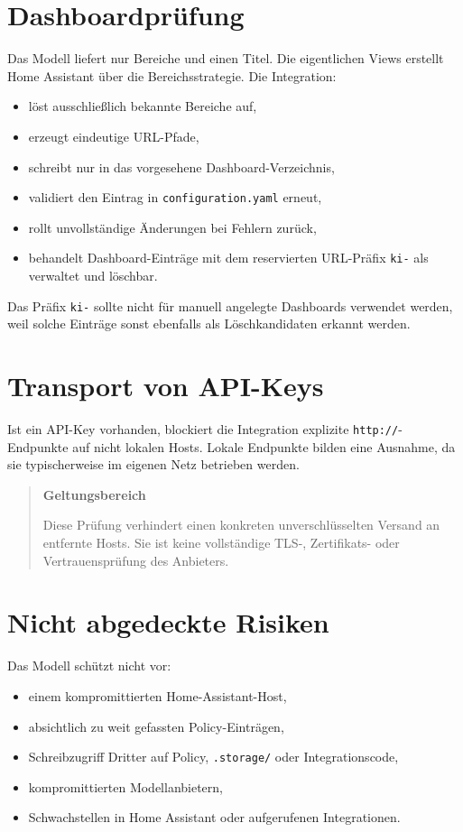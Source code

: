 \documentclass[
  11pt,
  a4paper,
  oneside,
  parskip=half
]{scrreprt}
\newcommand{\code}[1]{\texttt{#1}}
\newenvironment{smartnote}[1]
{%
  \begin{quote}
    \color{SmartPanel}
    \textbf{\textcolor{SmartBlue}{#1}}\par\smallskip
}
{%
  \end{quote}
}
\begin{document}
\section{Dashboardprüfung}

Das Modell liefert nur Bereiche und einen Titel. Die eigentlichen Views erstellt Home
Assistant über die Bereichsstrategie. Die Integration:

\begin{itemize}
  \item löst ausschließlich bekannte Bereiche auf,
  \item erzeugt eindeutige URL-Pfade,
  \item schreibt nur in das vorgesehene Dashboard-Verzeichnis,
  \item validiert den Eintrag in \code{configuration.yaml} erneut,
  \item rollt unvollständige Änderungen bei Fehlern zurück,
  \item behandelt Dashboard-Einträge mit dem reservierten URL-Präfix \code{ki-} als
        verwaltet und löschbar.
\end{itemize}

Das Präfix \code{ki-} sollte nicht für manuell angelegte Dashboards verwendet werden,
weil solche Einträge sonst ebenfalls als Löschkandidaten erkannt werden.

\section{Transport von API-Keys}

Ist ein API-Key vorhanden, blockiert die Integration explizite
\code{http://}-Endpunkte auf nicht lokalen Hosts. Lokale Endpunkte bilden eine
Ausnahme, da sie typischerweise im eigenen Netz betrieben werden.

\begin{smartnote}{Geltungsbereich}
Diese Prüfung verhindert einen konkreten unverschlüsselten Versand an entfernte Hosts.
Sie ist keine vollständige TLS-, Zertifikats- oder Vertrauensprüfung des Anbieters.
\end{smartnote}

\section{Nicht abgedeckte Risiken}

Das Modell schützt nicht vor:

\begin{itemize}
  \item einem kompromittierten Home-Assistant-Host,
  \item absichtlich zu weit gefassten Policy-Einträgen,
  \item Schreibzugriff Dritter auf Policy, \code{.storage/} oder Integrationscode,
  \item kompromittierten Modellanbietern,
  \item Schwachstellen in Home Assistant oder aufgerufenen Integrationen.
\end{itemize}
\end{document}
